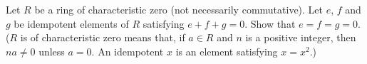 \documentclass{article}
\begin{document}
\setlength{\parindent}{0pt}
Let $R$ be a ring of characteristic zero (not necessarily commutative). Let $e$, $f$ and $g$ be idempotent elements of $R$ satisfying $e+f+g=0$. Show that $e=f=g=0$.\newline
($R$ is of characteristic zero means that, if $a\in R$ and $n$ is a positive integer, then $na\ne0$ unless $a=0$. An idempotent $x$ is an element satisfying $x=x^{2}$.)
\end{document}
